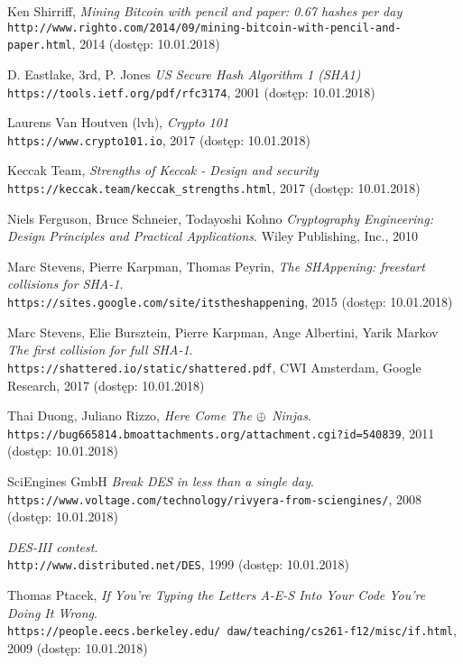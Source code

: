 \begin{thebibliography}{9}
Ken Shirriff,
\textit{Mining Bitcoin with pencil and paper: 0.67 hashes per day} \\ 
\texttt{http://www.righto.com/2014/09/mining-bitcoin-with-pencil-and-paper.html}, 2014 (dostęp: 10.01.2018)

D. Eastlake, 3rd, P. Jones
\textit{US Secure Hash Algorithm 1 (SHA1)} \\ 
\texttt{https://tools.ietf.org/pdf/rfc3174}, 2001 (dostęp: 10.01.2018)

Laurens Van Houtven (lvh),
\textit{Crypto 101} \\ 
\texttt{https://www.crypto101.io}, 2017 (dostęp: 10.01.2018)

Keccak Team,
\textit{Strengths of Keccak - Design and security} \\ 
\texttt{https://keccak.team/keccak\_strengths.html}, 2017 (dostęp: 10.01.2018)

Niels Ferguson, Bruce Schneier, Todayoshi Kohno
\textit{Cryptography Engineering: Design Principles and Practical Applications}. Wiley Publishing, Inc., 2010

Marc Stevens, Pierre Karpman, Thomas Peyrin,
\textit{The SHAppening: freestart collisions for SHA-1}. \\
\texttt{https://sites.google.com/site/itstheshappening}, 2015 (dostęp: 10.01.2018)

Marc Stevens, Elie Bursztein, Pierre Karpman, Ange Albertini, Yarik Markov
\textit{The first collision for full SHA-1}. \\
\texttt{https://shattered.io/static/shattered.pdf}, CWI Amsterdam, Google Research, 2017 (dostęp: 10.01.2018)

Thai Duong, Juliano Rizzo, 
\textit{Here Come The $\mathbin{\oplus}$ Ninjas}. \\
\texttt{https://bug665814.bmoattachments.org/attachment.cgi?id=540839}, 2011 (dostęp: 10.01.2018)

SciEngines GmbH
\textit{Break DES in less than a single day}. \\
\texttt{https://www.voltage.com/technology/rivyera-from-sciengines/}, 2008 (dostęp: 10.01.2018)

\textit{DES-III contest}. \\
\texttt{http://www.distributed.net/DES}, 1999 (dostęp: 10.01.2018)

Thomas Ptacek, 
\textit{If You’re Typing the Letters A-E-S Into Your Code You’re Doing It Wrong}. \\
\texttt{https://people.eecs.berkeley.edu/~daw/teaching/cs261-f12/misc/if.html}, 2009 (dostęp: 10.01.2018)


\end{thebibliography}
